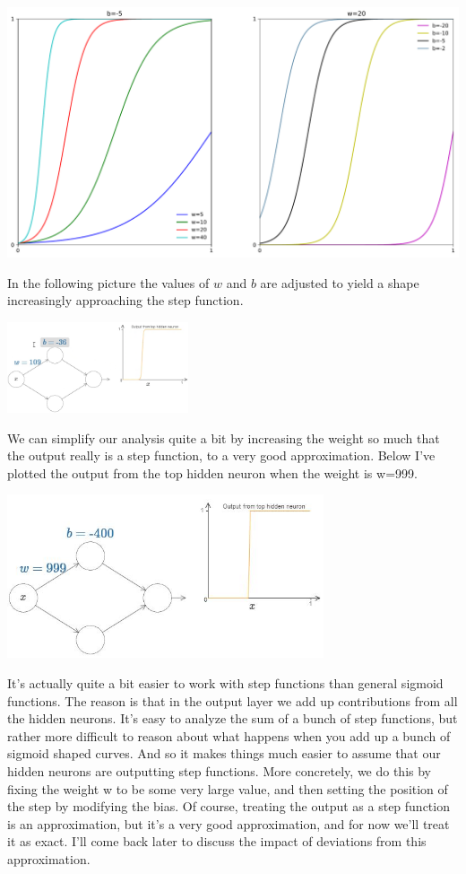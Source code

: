 {\centering \includegraphics[width=\textwidth,]{eps/sigmoid1x2plot} \par}

In the following picture the values of $w$ and $b$ are adjusted to yield a shape increasingly approaching the step function.
{\centering \includegraphics[width=0.4\textwidth,]{pic/wigglyfn08.png} \par}


We can simplify our analysis quite a bit by increasing the weight so much that the output really is a step function, to a very good approximation. Below I've plotted the output from the top hidden neuron when the weight is w=999. 

{\centering \includegraphics[width=0.7\textwidth,]{pic/high_weight_function.jpg} \par}

It's actually quite a bit easier to work with step functions than general sigmoid functions. The reason is that in the output layer we add up contributions from all the hidden neurons. It's easy to analyze the sum of a bunch of step functions, but rather more difficult to reason about what happens when you add up a bunch of sigmoid shaped curves. And so it makes things much easier to assume that our hidden neurons are outputting step functions. More concretely, we do this by fixing the weight w
to be some very large value, and then setting the position of the step by modifying the bias. Of course, treating the output as a step function is an approximation, but it's a very good approximation, and for now we'll treat it as exact. I'll come back later to discuss the impact of deviations from this approximation.

